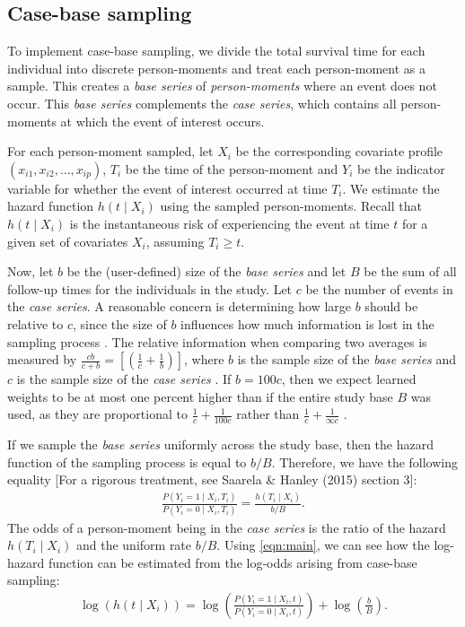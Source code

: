 \documentclass[preprint,12pt,authoryear]{elsarticle}
\begin{document}
\hypertarget{case-base-sampling}{%
\subsection{Case-base sampling}\label{case-base-sampling}}

To implement case-base sampling, we divide the total survival time for each individual into discrete person-moments and treat each person-moment as a sample. This creates a \emph{base series} of \emph{person-moments} where an event does not occur. This \emph{base series} complements the \emph{case series}, which contains all person-moments at which the event of interest occurs.

For each person-moment sampled, let \(X_i\) be the corresponding covariate profile
\(\left(x_{i1},x_{i2},...,x_{ip} \right)\), \(T_i\) be the time of the person-moment and \(Y_i\) be the indicator variable for whether the event of interest occurred at time \(T_i\). We estimate the hazard function
\(h(t \mid X_i)\) using the sampled person-moments. Recall that \(h(t \mid X_i)\) is the instantaneous risk of experiencing the event at time \(t\) for a given set of covariates \(X_i\), assuming \(T_i \geq t\).

Now, let \(b\) be the (user-defined) size of the \emph{base series} and let \(B\) be the sum of all follow-up times for the individuals in the study. Let $c$ be the number of events in the \emph{case series}. A reasonable concern is determining how large $b$ should be relative to $c$, since the size of \(b\) influences how much information is lost in the sampling process \citep{hanley2009}. The relative information when comparing two averages is measured by $\frac{cb}{c+b}=\left[\left( \frac{1}{c}+\frac{1}{b}\right)\right]$, where $b$ is the sample size of the \emph{base series} and $c$ is the sample size of the \emph{case series} \citep{hanley2009} \citep{mantel1}. If $b=100c$, then we expect learned weights to be at most one percent higher than if the entire study base $B$ was used, as they are proportional to $\frac{1}{c}+\frac{1}{100c}$ rather than $\frac{1}{c}+\frac{1}{\infty c}$ \citep{hanley2009} \citep{mantel1}.

If we sample the \emph{base series} uniformly across the study base, then the hazard function of the sampling process is equal to \(b/B\). Therefore, we have the following equality \citep{saarela2015}
[For a rigorous treatment, see Saarela \& Hanley (2015) section 3]:
\begin{align}\label{eqn:main}
\frac{P\left(Y_i=1 \mid X_i, T_i\right)}{P\left(Y_i = 0 \mid X_i, T_i\right)} = \frac{h\left(T_i \mid X_i\right)}{b/B}.
\end{align} The odds of a person-moment being in the \emph{case
series} is the ratio of the hazard \(h(T_i \mid X_i)\) and the uniform
rate \(b/B\). Using \eqref{eqn:main}, we can see how the log-hazard
function can be estimated from the log-odds arising from case-base
sampling: \begin{align}\label{eqn:offset}
\log \left( h\left(t \mid X_i\right)\right) = \log \left(\frac{P\left(Y_i = 1 \mid X_i, t\right)}{P\left(Y_i = 0 \mid X_i, t\right)}\right) + \log\left(\frac{b}{B}\right).
\end{align}
\end{document}
